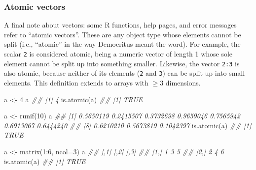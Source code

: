 \documentclass[
  13,
  letterpaper,
]{report}
\newenvironment{Shaded}{\begin{snugshade}}{\end{snugshade}}
\newcommand{\AttributeTok}[1]{\textcolor[rgb]{0.40,0.45,0.13}{#1}}
\newcommand{\DecValTok}[1]{\textcolor[rgb]{0.68,0.00,0.00}{#1}}
\newcommand{\DocumentationTok}[1]{\textcolor[rgb]{0.37,0.37,0.37}{\textit{#1}}}
\newcommand{\FunctionTok}[1]{\textcolor[rgb]{0.28,0.35,0.67}{#1}}
\newcommand{\NormalTok}[1]{\textcolor[rgb]{0.00,0.23,0.31}{#1}}
\newcommand{\OtherTok}[1]{\textcolor[rgb]{0.00,0.23,0.31}{#1}}
\newcommand{\SpecialCharTok}[1]{\textcolor[rgb]{0.37,0.37,0.37}{#1}}
\begin{document}
\subsubsection{Atomic vectors}\label{sec-object-struct-vect-atom}

A final note about vectors: some R functions, help pages, and error
messages refer to ``atomic vectors''. These are any object type whose
elements cannot be split (i.e., ``atomic'' in the way Democritus meant
the word). For example, the scalar \texttt{2} is considered atomic,
being a numeric vector of length 1 whose sole element cannot be split up
into something smaller. Likewise, the vector \texttt{2:3} is also
atomic, because neither of its elements (\texttt{2} and \texttt{3}) can
be split up into small elements. This definition extends to arrays with
\(\geq3\) dimensions.

\begin{Shaded}
\begin{Highlighting}[]
\NormalTok{a }\OtherTok{\textless{}{-}} \DecValTok{4}
\NormalTok{a}
\DocumentationTok{\#\# [1] 4}
\FunctionTok{is.atomic}\NormalTok{(a)}
\DocumentationTok{\#\# [1] TRUE}
\end{Highlighting}
\end{Shaded}

\begin{Shaded}
\begin{Highlighting}[]
\NormalTok{a }\OtherTok{\textless{}{-}} \FunctionTok{runif}\NormalTok{(}\DecValTok{10}\NormalTok{)}
\NormalTok{a}
\DocumentationTok{\#\#  [1] 0.5650119 0.2415507 0.3732698 0.9659046 0.7565942 0.6913067 0.6444240}
\DocumentationTok{\#\#  [8] 0.6210210 0.5673819 0.1042397}
\FunctionTok{is.atomic}\NormalTok{(a)}
\DocumentationTok{\#\# [1] TRUE}
\end{Highlighting}
\end{Shaded}

\begin{Shaded}
\begin{Highlighting}[]
\NormalTok{a }\OtherTok{\textless{}{-}} \FunctionTok{matrix}\NormalTok{(}\DecValTok{1}\SpecialCharTok{:}\DecValTok{6}\NormalTok{, }\AttributeTok{ncol=}\DecValTok{3}\NormalTok{)}
\NormalTok{a}
\DocumentationTok{\#\#      [,1] [,2] [,3]}
\DocumentationTok{\#\# [1,]    1    3    5}
\DocumentationTok{\#\# [2,]    2    4    6}
\FunctionTok{is.atomic}\NormalTok{(a)}
\DocumentationTok{\#\# [1] TRUE}
\end{Highlighting}
\end{Shaded}
\end{document}

